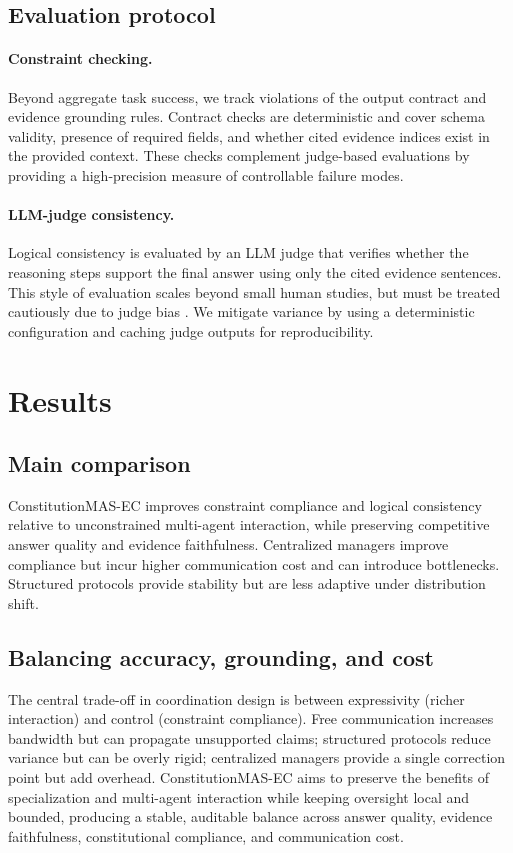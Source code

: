 \documentclass{article}
\newcommand{\framework}{ConstitutionMAS-EC\xspace}
\theoremstyle{plain}
\theoremstyle{definition}
\begin{document}
\subsection{Evaluation protocol}
\paragraph{Constraint checking.}
Beyond aggregate task success, we track violations of the output contract and evidence grounding rules. Contract checks are deterministic and cover schema validity, presence of required fields, and whether cited evidence indices exist in the provided context. These checks complement judge-based evaluations by providing a high-precision measure of controllable failure modes.

\paragraph{LLM-judge consistency.}
Logical consistency is evaluated by an LLM judge that verifies whether the reasoning steps support the final answer using only the cited evidence sentences. This style of evaluation scales beyond small human studies, but must be treated cautiously due to judge bias \citep{zheng2023judging,wang2023surveyjudge}. We mitigate variance by using a deterministic configuration and caching judge outputs for reproducibility.

\section{Results}
\label{sec:results}
\subsection{Main comparison}
\framework improves constraint compliance and logical consistency relative to unconstrained multi-agent interaction, while preserving competitive answer quality and evidence faithfulness. Centralized managers improve compliance but incur higher communication cost and can introduce bottlenecks. Structured protocols provide stability but are less adaptive under distribution shift.

\subsection{Balancing accuracy, grounding, and cost}
The central trade-off in coordination design is between expressivity (richer interaction) and control (constraint compliance). Free communication increases bandwidth but can propagate unsupported claims; structured protocols reduce variance but can be overly rigid; centralized managers provide a single correction point but add overhead. \framework aims to preserve the benefits of specialization and multi-agent interaction while keeping oversight local and bounded, producing a stable, auditable balance across answer quality, evidence faithfulness, constitutional compliance, and communication cost.
\end{document}

